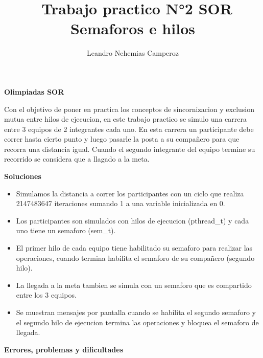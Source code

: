 \documentclass[a4paper, 14pt]{article}
\title{\
  Trabajo practico N°2 SOR\\
  Semaforos e hilos}
\author{Leandro Nehemias Camperoz}
\begin{document}
\maketitle
\newpage
\textbf{{\huge Olimpiadas SOR}}\newline

Con el objetivo de poner en practica los conceptos de sincornizacion y exclusion mutua entre hilos de ejecucion, en este trabajo practico se simulo una carrera entre 3 equipos de 2 integrantes cada uno. En esta carrera un participante debe correr hasta cierto punto y luego pasarle la posta a su compañero para que recorra una distancia igual. Cuando el segundo integrante del equipo termine su recorrido se considera que a llagado a la meta.\newline


\vspace{1.5cm}

\textbf{\LARGE Soluciones}\newline

\begin{itemize}
\item Simulamos la distancia a correr los participantes con un ciclo que realiza 2147483647 iteraciones sumando 1 a una variable inicializada en 0.
\item Los participantes son simulados con hilos de ejecucion (pthread\_t) y cada uno tiene un semaforo (sem\_t).
\item El primer hilo de cada equipo tiene habilitado su semaforo para realizar las operaciones, cuando termina habilita el semaforo de su compañero (segundo hilo).
\item La llegada a la meta tambien se simula con un semaforo que es compartido entre los 3 equipos.
\item Se muestran mensajes por pantalla cuando se habilita el segundo semaforo y el segundo hilo de ejecucion termina las operaciones y bloquea el semaforo de llegada.
\end{itemize}

\vspace{1.5cm}

\textbf{{\LARGE Errores, problemas y dificultades}}
\end{document}
